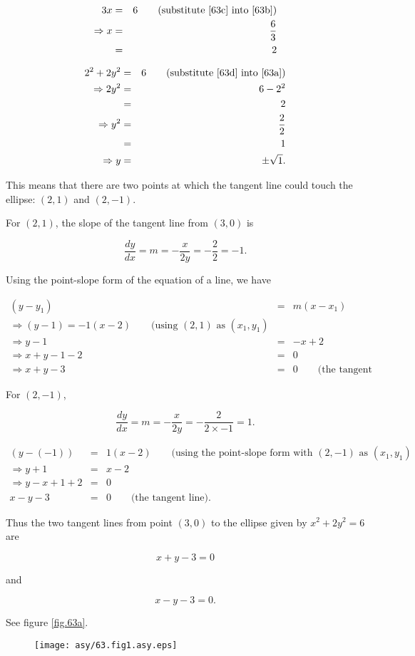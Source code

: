 \begin{eqnarray}
	3x&=&6\qquad\mbox{(substitute \ref{63c} into \ref{63b})}\nonumber\\
	\Rightarrow x&=&\frac{6}{3}\label{63d}\\
	&=&2\nonumber
\end{eqnarray}

\begin{eqnarray*}
	2^2+2y^2&=&6\qquad\mbox{(substitute \ref{63d} into \ref{63a})}\\
	\Rightarrow2y^2&=&6-2^2\\
	&=&2\\
	\Rightarrow y^2&=&\frac{2}{2}\\
	&=&1\\
	\Rightarrow y&=&\pm\sqrt{1}.
\end{eqnarray*}

This means that there are two points at which the tangent line could touch the ellipse: $\left(2,1\right)$ and $\left(2,-1\right)$.

For $\left(2,1\right)$, the slope of the tangent line from $\left(3,0\right)$ is

\[\frac{dy}{dx}=m=-\frac{x}{2y}=-\frac{2}{2}=-1.\]

Using the point-slope form of the equation of a line, we have

\begin{eqnarray*}
    \left(y-y_1\right)&=&m\left(x-x_1\right)\\
    \Rightarrow\left(y-1\right)=-1\left(x-2\right)\qquad\mbox{(using }\left(2,1\right)\mbox{ as }\left(x_1,y_1\right)\\
    \Rightarrow y-1&=&-x+2\\
    \Rightarrow x+y-1-2&=&0\\
    \Rightarrow x+y-3&=&0\qquad\mbox{(the tangent line).}
\end{eqnarray*}

For $\left(2,-1\right)$,

\[\frac{dy}{dx}=m=-\frac{x}{2y}=-\frac{2}{2\times-1}=1.\]

\begin{eqnarray*}
    \left(y-\left(-1\right)\right)&=&1\left(x-2\right)\qquad\mbox{(using the point-slope form with }\left(2,-1\right)\mbox{ as }\left(x_1,y_1\right)\\
    \Rightarrow y+1&=&x-2\\
    \Rightarrow y-x+1+2&=&0\\
    x-y-3&=&0\qquad\mbox{(the tangent line).}
\end{eqnarray*}

Thus the two tangent lines from point $\left(3,0\right)$ to the ellipse given by $x^2+2y^2=6$ are

\[x+y-3=0\]

and

\[x-y-3=0.\]

See figure \vref{fig.63a}.

\begin{figure}\caption{}\begin{center}\label{fig.63a}\texttt{[image: asy/63.fig1.asy.eps]}\end{center}\end{figure}
